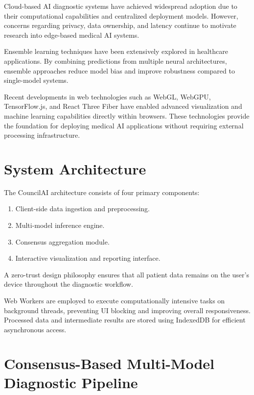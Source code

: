 \documentclass[journal]{IEEEtran}
\begin{document}
Cloud-based AI diagnostic systems have achieved widespread adoption due to their computational capabilities and centralized deployment models. However, concerns regarding privacy, data ownership, and latency continue to motivate research into edge-based medical AI systems.

Ensemble learning techniques have been extensively explored in healthcare applications. By combining predictions from multiple neural architectures, ensemble approaches reduce model bias and improve robustness compared to single-model systems.

Recent developments in web technologies such as WebGL, WebGPU, TensorFlow.js, and React Three Fiber have enabled advanced visualization and machine learning capabilities directly within browsers. These technologies provide the foundation for deploying medical AI applications without requiring external processing infrastructure.

\section{System Architecture}

The CouncilAI architecture consists of four primary components:

\begin{enumerate}
    \item Client-side data ingestion and preprocessing.
    \item Multi-model inference engine.
    \item Consensus aggregation module.
    \item Interactive visualization and reporting interface.
\end{enumerate}

A zero-trust design philosophy ensures that all patient data remains on the user's device throughout the diagnostic workflow.

Web Workers are employed to execute computationally intensive tasks on background threads, preventing UI blocking and improving overall responsiveness. Processed data and intermediate results are stored using IndexedDB for efficient asynchronous access.

\section{Consensus-Based Multi-Model Diagnostic Pipeline}
\end{document}

